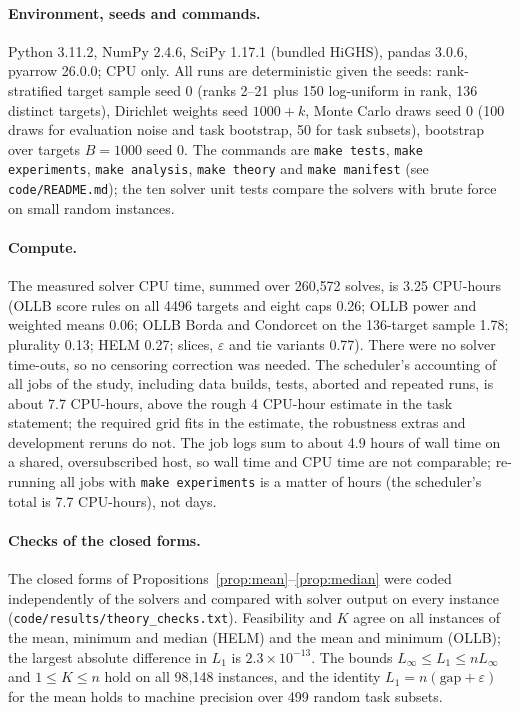 \paragraph{Environment, seeds and commands.}
Python 3.11.2, NumPy 2.4.6, SciPy 1.17.1 (bundled HiGHS), pandas 3.0.6, pyarrow 26.0.0; CPU only. All runs are deterministic given the seeds: rank-stratified target sample seed 0 (ranks 2--21 plus 150 log-uniform in rank, 136 distinct targets), Dirichlet weights seed $1000+k$, Monte Carlo draws seed 0 (100 draws for evaluation noise and task bootstrap, 50 for task subsets), bootstrap over targets $B=1000$ seed 0. The commands are \texttt{make tests}, \texttt{make experiments}, \texttt{make analysis}, \texttt{make theory} and \texttt{make manifest} (see \texttt{code/README.md}); the ten solver unit tests compare the solvers with brute force on small random instances.

\paragraph{Compute.}
The measured solver CPU time, summed over 260{,}572 solves, is 3.25 CPU-hours (OLLB score rules on all 4496 targets and eight caps 0.26; OLLB power and weighted means 0.06; OLLB Borda and Condorcet on the 136-target sample 1.78; plurality 0.13; HELM 0.27; slices, $\varepsilon$ and tie variants 0.77). There were no solver time-outs, so no censoring correction was needed. The scheduler's accounting of all jobs of the study, including data builds, tests, aborted and repeated runs, is about 7.7 CPU-hours, above the rough 4 CPU-hour estimate in the task statement; the required grid fits in the estimate, the robustness extras and development reruns do not. The job logs sum to about 4.9 hours of wall time on a shared, oversubscribed host, so wall time and CPU time are not comparable; re-running all jobs with \texttt{make experiments} is a matter of hours (the scheduler's total is 7.7 CPU-hours), not days.

\paragraph{Checks of the closed forms.}
The closed forms of Propositions~\ref{prop:mean}--\ref{prop:median} were coded independently of the solvers and compared with solver output on every instance (\texttt{code/results/theory\_checks.txt}). Feasibility and $K$ agree on all instances of the mean, minimum and median (HELM) and the mean and minimum (OLLB); the largest absolute difference in $L_1$ is $2.3\times10^{-13}$. The bounds $L_\infty\le L_1\le nL_\infty$ and $1\le K\le n$ hold on all 98{,}148 instances, and the identity $L_1=n(\text{gap}+\varepsilon)$ for the mean holds to machine precision over 499 random task subsets.


